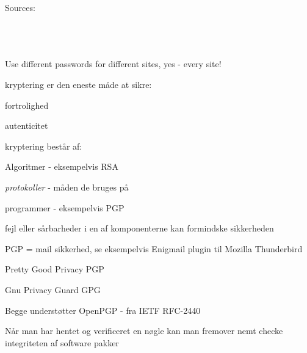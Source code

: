 \documentclass[Screen16to9,17pt]{foils}
\begin{document}

 Sources:\\
{\footnotesize{}\\
\\
\\
}

\vskip 5mm
\centerline{Use different passwords for different sites, yes - every site!}




\begin{list1}
  \item kryptering er den eneste måde at sikre:
    \begin{list2}
      \item fortrolighed
      \item autenticitet
    \end{list2}
\item kryptering består af:
  \begin{list2}
    \item Algoritmer - eksempelvis RSA
    \item \emph{protokoller} - måden de bruges på
\item programmer - eksempelvis PGP
\end{list2}
\item fejl eller sårbarheder i en af komponenterne kan formindske
  sikkerheden
\item PGP = mail sikkerhed, se eksempelvis Enigmail plugin til Mozilla Thunderbird

\end{list1}


\begin{list1}
\item Pretty Good Privacy PGP
\item Gnu Privacy Guard GPG
\item Begge understøtter OpenPGP - fra IETF RFC-2440
\item Når man har hentet og verificeret en nøgle kan man fremover nemt
checke integriteten af software pakker
\end{list1}
\end{document}
